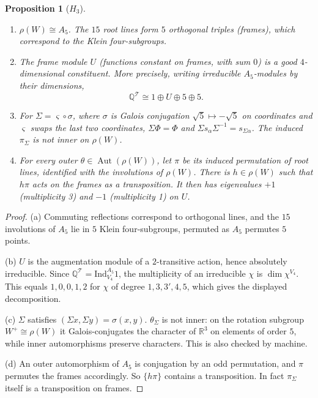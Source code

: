 \documentclass[11pt]{article}
\newtheorem{proposition}[theorem]{Proposition}
\theoremstyle{definition}
\newcommand{\Q}{\mathbb{Q}}
\newcommand{\T}{\mathcal{T}}
\newcommand{\Aut}{\operatorname{Aut}}
\begin{document}
\begin{proposition}[$H_3$]\label{prop:H3}
\begin{enumerate}[label=(\alph*)]
\item $\rho(W)\cong A_5$. The $15$ root lines form $5$ orthogonal triples (\emph{frames}), which correspond to the
Klein four-subgroups.
\item The frame module $U$ (functions constant on frames, with sum $0$) is a good $4$-dimensional constituent.
More precisely, writing irreducible $A_5$-modules by their dimensions,
\[\Q^\T\cong1\oplus U\oplus5\oplus5 .\]
\item For $\Sigma=\varsigma\circ\sigma$, where $\sigma$ is Galois conjugation $\sqrt5\mapsto-\sqrt5$ on coordinates
and $\varsigma$ swaps the last two coordinates, $\Sigma\Phi=\Phi$ and $\Sigma s_\alpha\Sigma^{-1}=s_{\Sigma\alpha}$. The
induced $\pi_\Sigma$ is not inner on $\rho(W)$.
\item For every outer $\theta\in\Aut(\rho(W))$, let $\pi$ be its induced permutation of root lines,
identified with the involutions of $\rho(W)$. There is $h\in\rho(W)$ such that $h\pi$ acts on the frames as a transposition. It then has
eigenvalues $+1$ (multiplicity 3) and $-1$ (multiplicity 1) on $U$.
\end{enumerate}
\end{proposition}

\begin{proof}
(a) Commuting reflections correspond to orthogonal lines, and the $15$ involutions of $A_5$ lie in $5$ Klein
four-subgroups, permuted as $A_5$ permutes $5$ points.

(b) $U$ is the augmentation module of a $2$-transitive action, hence absolutely irreducible. Since
$\Q^\T=\mathrm{Ind}_{V_4}^{A_5}1$, the multiplicity of an irreducible $\chi$ is $\dim\chi^{V_4}$. This equals
$1,0,0,1,2$ for $\chi$ of degree $1,3,3',4,5$, which gives the displayed decomposition.

(c) $\Sigma$ satisfies $(\Sigma x,\Sigma y)=\sigma(x,y)$. $\theta_\Sigma$ is not inner: on the rotation subgroup $W^+\cong\rho(W)$ it Galois-conjugates the character of
$\mathbb R^3$ on elements of order $5$, while inner automorphisms preserve characters. This is also checked by
machine.

(d) An outer automorphism of $A_5$ is conjugation by an odd permutation, and $\pi$ permutes the frames accordingly.
So $\{h\pi\}$ contains a transposition. In fact $\pi_\Sigma$ itself is a transposition on frames.
\end{proof}
\end{document}
